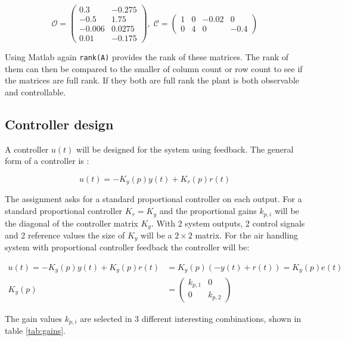 \documentclass[a4paper, titlepage]{article}
\begin{document}
\begin{equation}
\mathcal{O} = 
\begin{pmatrix}
0.3 & -0.275		\\
-0.5 & 1.75		\\
-0.006 & 0.0275	\\
0.01 & -0.175
\end{pmatrix}
,\;
\mathcal{C} = 
\begin{pmatrix}
1 & 0 & -0.02 & 0 \\
0 & 4 & 0 & -0.4
\end{pmatrix}
\end{equation}

Using Matlab again \verb|rank(A)| provides the rank of these matrices.
The rank of them can then be compared to the smaller of column count or row count to see if the matrices are full rank.
If they both are full rank the plant is both observable and controllable.

\subsection{Controller design}
A controller $u(t)$ will be designed for the system using feedback.
The general form of a controller is \citep[p.~147]{glad00}:

\begin{equation}
u(t) = -K_y(p)y(t) + K_r(p)r(t)
\end{equation}

The assignment asks for a standard proportional controller on each output.
For a standard proportional controller $K_r = K_y$ and the proportional gains $k_{p,i}$ will be the diagonal of the controller matrix $K_y$.
With 2 system outputs, 2 control signals and 2 reference values the size of $K_y$ will be a $2 \times 2$ matrix.
For the air handling system with proportional controller feedback the controller will be:

\begin{equation}
\begin{split}
u(t) = -K_y(p)y(t) + K_y(p)r(t) &= 
K_y(p)(-y(t) + r(t)) = 
K_y(p)e(t) \\
K_y(p) &= 
\begin{pmatrix}
k_{p,1} 	& 	0 		\\
0 		&	k_{p,2}	
\end{pmatrix}
\end{split}
\end{equation}

The gain values $k_{p,i}$ are selected in 3 different interesting combinations, shown in table \ref{tab:gains}.
\end{document}
